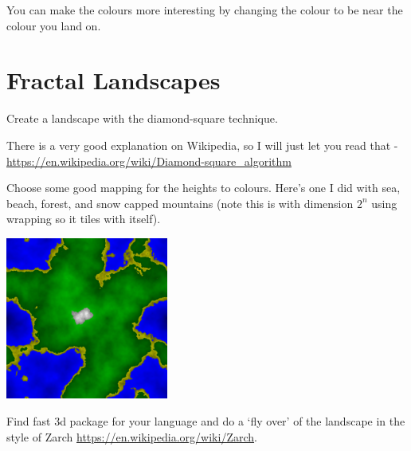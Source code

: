 \documentclass{article}
\begin{document}
        You can make the colours more interesting by changing the colour to be near the colour you land on.        

    \section{Fractal Landscapes}
        Create a landscape with the diamond-square technique.  
        
        There is a very good explanation on Wikipedia, so I will just let you read that - 
        \url{https://en.wikipedia.org/wiki/Diamond-square_algorithm}
        
        Choose some good mapping for the heights to colours.  Here's one I did with sea, beach, forest, and snow capped mountains (note 
        this is with dimension $2^n$ using wrapping so it tiles with itself).
        
        \begin{center}
            \includegraphics[width=0.4\textwidth]{land}
        \end{center}
        
        Find fast 3d package for your language and do a `fly over' of the landscape in the style of Zarch 
        \url{https://en.wikipedia.org/wiki/Zarch}.
\end{document}
